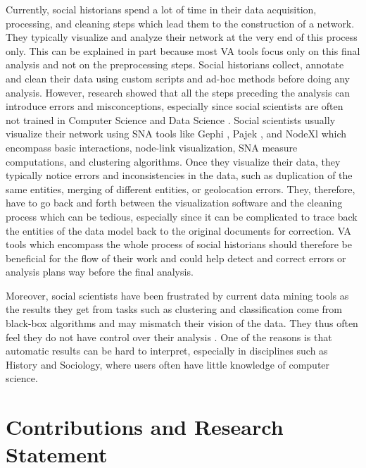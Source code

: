 Currently, social historians spend a lot of time in their data acquisition, processing, and cleaning steps which lead them to the construction of a network.
They typically visualize and analyze their network at the very end of this process only.
This can be explained in part because most VA tools focus only on this final analysis and not on the preprocessing steps.
Social historians collect, annotate and clean their data using custom scripts and ad-hoc methods before doing any analysis.
However, research showed that all the steps preceding the analysis can introduce errors and misconceptions, especially since social scientists are often not trained in Computer Science and Data Science \cite{lemercier12FormalNetwork2015a, lkadi2022}.
Social scientists usually visualize their network using SNA tools like Gephi \cite{Gephi}, Pajek \cite{pajek}, and NodeXl \cite{noauthor_nodexl_nodate} which encompass basic interactions, node-link visualization, SNA measure computations, and clustering algorithms.
Once they visualize their data, they typically notice errors and inconsistencies in the data, such as duplication of the same entities, merging of different entities, or geolocation errors.
They, therefore, have to go back and forth between the visualization software and the cleaning process which can be tedious, especially since it can be complicated to trace back the entities of the data model back to the original documents for correction.
VA tools which encompass the whole process of social historians should therefore be beneficial for the flow of their work and could help detect and correct errors or analysis plans way before the final analysis.

Moreover, social scientists have been frustrated by current data mining tools as the results they get from tasks such as clustering and classification come from black-box algorithms and may mismatch their vision of the data.
They thus often feel they do not have control over their analysis \cite{lepetitHistoireQuantitativeDeux1989}.
One of the reasons is that automatic results can be hard to interpret, especially in disciplines such as History and Sociology, where users often have little knowledge of computer science.



\section{Contributions and Research Statement}\label{sec:contribution-and-research-statement}


